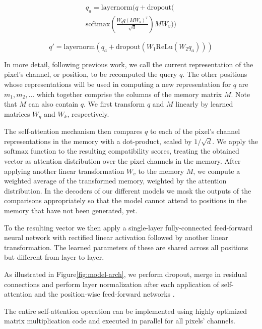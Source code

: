 \documentclass{article}
\newcommand{\modeldim}{d}
\newcommand{\query}{q}
\newcommand{\val}{v}
\newcommand{\key}{k}
\begin{document}
\begin{multline}
\query_{a} = \mathrm{layernorm}(q + \mathrm{dropout}( \\ 
\mathrm{softmax}\left(\frac{W_{\query} \query (M W_{\key})^T }{\sqrt{d}} \right) M W_{\val}))
\label{eqn:self-attention}
\end{multline}

\begin{equation}
\query' = \mathrm{layernorm}(\query_{a} + \mathrm{dropout} (W_1 \mathrm{ReLu}(W_2 \query_{a})))
\label{eqn:FFNN}
\end{equation}


In more detail, following previous work, we call the current representation of the pixel's channel, or position, to be recomputed the query $q$. The other positions whose representations will be used in computing a new representation for $q$ are $m_1, m_2, \ldots$ which together comprise the columns of the memory matrix $M$.
Note that $M$ can also contain $q$. We first transform $q$ and $M$ linearly by learned matrices $W_q$ and $W_k$, respectively.

The self-attention mechanism then compares $q$ to each of the pixel's channel representations in the memory with a dot-product, scaled by $1/\sqrt{\modeldim}$. We apply the $\mathrm{softmax}$ function to the resulting compatibility scores, treating the obtained vector as attention distribution over the pixel channels in the memory. After applying another linear transformation $W_v$ to the memory $M$, we compute a weighted average of the transformed memory, weighted by the attention distribution. In the decoders of our different models we mask the outputs of the comparisons appropriately so that the model cannot attend to positions in the memory that have not been generated, yet.

To the resulting vector we then apply a single-layer fully-connected feed-forward neural network with rectified linear activation followed by another linear transformation. The learned parameters of these are shared across all positions but different from layer to layer.

As illustrated in Figure\ref{fig:model-arch}, we perform dropout, merge in residual connections and perform layer normalization after each application of self-attention and the position-wise feed-forward networks \citep{layernorm2016, srivastava2014dropout}.

The entire self-attention operation can be implemented using highly optimized matrix multiplication code and executed in parallel for all pixels' channels.
\end{document}
